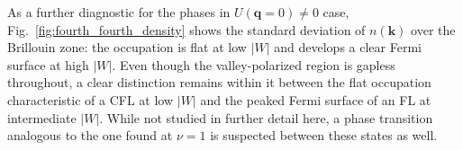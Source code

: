 As a further diagnostic for the phases in $U(\mathbf{q} = 0) \neq 0$ case, Fig.~\ref{fig:fourth_fourth_density} shows the standard deviation of $n(\mathbf{k})$ over the Brillouin zone: the occupation is flat at low $|W|$ and develops a clear Fermi surface at high $|W|$. Even though the valley-polarized region is gapless throughout, a clear distinction remains within it between the flat occupation characteristic of a CFL at low $|W|$ and the peaked Fermi surface of an FL at intermediate $|W|$. While not studied in further detail here, a phase transition analogous to the one found at $\nu=1$ is suspected between these states as well.


